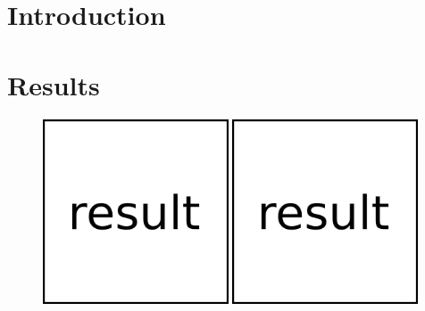 \documentclass{sciposter}
\begin{document}
\begin{multicols}{3}


\begin{abstract}
	\lipsum[1]
\end{abstract}


\section{Introduction}
\lipsum[1]

\section{Results}
\lipsum[1]
%
\begin{figure}
	\includegraphics[width=0.49\textwidth]{fig/result.png}
	\includegraphics[width=0.49\textwidth]{fig/result.png}
\end{figure}
%
\lipsum[1]
%
\begin{figure}

\end{figure}
\end{multicols}
\end{document}
